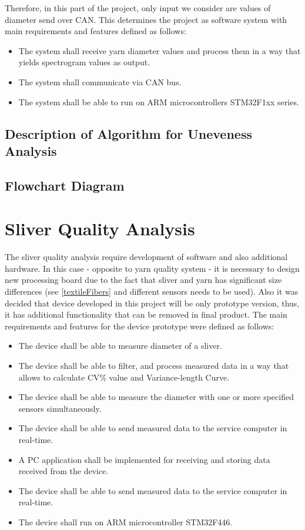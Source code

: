 \documentclass[twoside]{ctuthesis}
\theoremstyle{plain}
\theoremstyle{definition}
\theoremstyle{note}
\begin{document}
Therefore, in this part of the project, only input we consider are values of diameter send over CAN. This determines the project as software system with main requirements and features defined as follows:
\begin{itemize}
 	\setlength{\itemsep}{5pt}
 	\item The system shall receive yarn diameter values and process them in a way that yields spectrogram values as output.
 	\item The system shall communicate via CAN bus.
 	\item The system shall be able to run on ARM microcontrollers STM32F1xx series.
\end{itemize}

\subsection{Description of Algorithm for Uneveness Analysis}
\subsection{Flowchart Diagram}


\section{Sliver Quality Analysis}
 The sliver quality analysis require development of software and also additional hardware. In this case - opposite to yarn quality system - it is necessary to design new processing board due to the fact that sliver and yarn has significant size differences (see \ref{textileFibers} and different sensors needs to be used). Also it was decided that device developed in this project will be only prototype version, thus, it has additional functionality that can be removed in final product. The main requirements and features for the device prototype were defined as follows:
\begin{itemize}
	\setlength{\itemsep}{5pt}
	\item The device shall be able to measure diameter of a sliver.
	\item The device shall be able to filter, and process measured data in a way that allows to calculate CV\% value and Variance-length Curve.
	\item The device shall be able to measure the diameter with one or more specified sensors simultaneously.
	\item The device shall be able to send measured data to the service computer in real-time.
	\item A PC application shall be implemented for receiving and storing data received from the device.
	\item The device shall be able to send measured data to the service computer in real-time.
	\item The device shall run on ARM microcontroller STM32F446.
\end{itemize}
\end{document}
